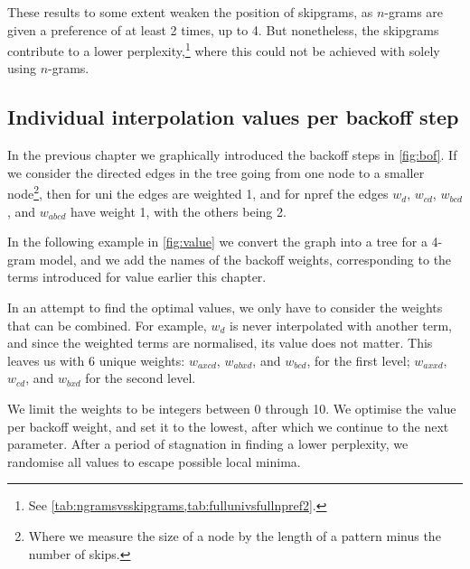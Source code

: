 These results to some extent weaken the position of skipgrams, as $n$-grams are given a preference of at least 2 times, up to 4. But nonetheless, the skipgrams contribute to a lower perplexity,\footnote{See \cref{tab:ngramsvsskipgrams,tab:fullunivsfullnpref2}.} where this could not be achieved with solely using $n$-grams.

\subsection{Individual interpolation values per backoff step}
In the previous chapter we graphically introduced the backoff steps in \cref{fig:bof}. If we consider the directed edges in the tree going from one node to a smaller node\footnote{Where we measure the size of a node by the length of a pattern minus the number of skips.}, then for \textsf{uni} the edges are weighted 1, and for \textsf{npref} the edges $w_{d}$, $w_{cd}$, $w_{bcd}$, and $w_{abcd}$ have weight 1, with the others being 2.

In the following example in \cref{fig:value} we convert the graph into a tree for a 4-gram model, and we add the names of the backoff weights, corresponding to the terms introduced for \textsf{value} earlier this chapter.

In an attempt to find the optimal values, we only have to consider the weights that can be combined. For example, $w_d$ is never interpolated with another term, and since the weighted terms are normalised, its value does not matter. This leaves us with 6 unique weights: $w_{axcd}$, $w_{abxd}$, and $w_{bcd}$, for the first level; $w_{axxd}$, $w_{cd}$, and $w_{bxd}$ for the second level.

We limit the weights to be integers between 0 through 10. We optimise the value per backoff weight, and set it to the lowest, after which we continue to the next parameter. After a period of stagnation in finding a lower perplexity, we randomise all values to escape possible local minima.





